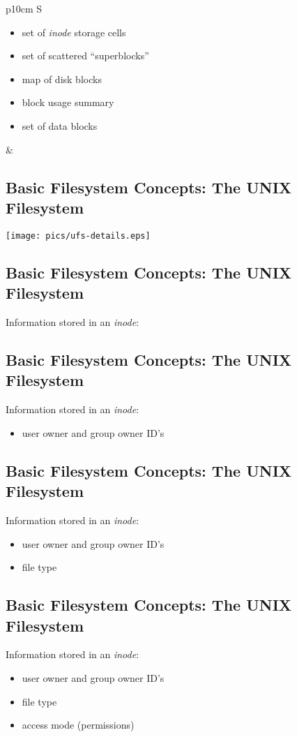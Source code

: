 \documentclass[xga]{xdvislides}
\begin{document}
\begin{tabular}{ p{10cm} S }
\begin{itemize}
	\item set of {\em inode} storage cells
	\item set of scattered ``superblocks''
	\item map of disk blocks
	\item block usage summary
	\item set of data blocks
\end{itemize}
&  \\
\end{tabular}

\subsection{Basic Filesystem Concepts: The UNIX Filesystem}
\begin{center}
	\texttt{[image: pics/ufs-details.eps]} \\
\end{center}
\vspace*{\fill}

\subsection{Basic Filesystem Concepts: The UNIX Filesystem}
Information stored in an {\em inode}:

\subsection{Basic Filesystem Concepts: The UNIX Filesystem}
Information stored in an {\em inode}:
\begin{itemize}
	\item user owner and group owner ID's
\end{itemize}

\subsection{Basic Filesystem Concepts: The UNIX Filesystem}
Information stored in an {\em inode}:
\begin{itemize}
	\item user owner and group owner ID's
	\item file type
\end{itemize}

\subsection{Basic Filesystem Concepts: The UNIX Filesystem}
Information stored in an {\em inode}:
\begin{itemize}
	\item user owner and group owner ID's
	\item file type
	\item access mode (permissions)
\end{itemize}
\end{document}

